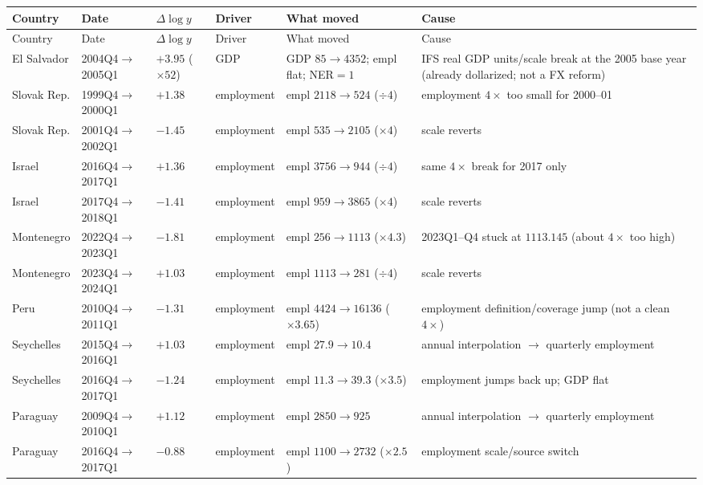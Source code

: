 \documentclass[11pt]{article}
\begin{document}
{\small
\setlength{\tabcolsep}{5pt}
\begin{longtable}{@{}llp{2.6cm}lp{3.6cm}p{6.8cm}@{}}
\toprule
Country & Date & $\Delta\log y$ & Driver & What moved & Cause \\
\midrule
\endfirsthead
\toprule
Country & Date & $\Delta\log y$ & Driver & What moved & Cause \\
\midrule
\endhead
\bottomrule
\endfoot
El Salvador & 2004Q4$\to$2005Q1 & $+3.95$ ($\times 52$) & GDP & GDP $85\to 4352$; empl flat; NER${}=1$ &
IFS real GDP units/scale break at the 2005 base year (already dollarized; not a FX reform) \\
\addlinespace
Slovak Rep. & 1999Q4$\to$2000Q1 & $+1.38$ & employment & empl $2118\to 524$ ($\div 4$) &
employment $4\times$ too small for 2000--01 \\
\addlinespace
Slovak Rep. & 2001Q4$\to$2002Q1 & $-1.45$ & employment & empl $535\to 2105$ ($\times 4$) &
scale reverts \\
\addlinespace
Israel & 2016Q4$\to$2017Q1 & $+1.36$ & employment & empl $3756\to 944$ ($\div 4$) &
same $4\times$ break for 2017 only \\
\addlinespace
Israel & 2017Q4$\to$2018Q1 & $-1.41$ & employment & empl $959\to 3865$ ($\times 4$) &
scale reverts \\
\addlinespace
Montenegro & 2022Q4$\to$2023Q1 & $-1.81$ & employment & empl $256\to 1113$ ($\times 4.3$) &
2023Q1--Q4 stuck at $1113.145$ (about $4\times$ too high) \\
\addlinespace
Montenegro & 2023Q4$\to$2024Q1 & $+1.03$ & employment & empl $1113\to 281$ ($\div 4$) &
scale reverts \\
\addlinespace
Peru & 2010Q4$\to$2011Q1 & $-1.31$ & employment & empl $4424\to 16136$ ($\times 3.65$) &
employment definition/coverage jump (not a clean $4\times$) \\
\addlinespace
Seychelles & 2015Q4$\to$2016Q1 & $+1.03$ & employment & empl $27.9\to 10.4$ &
annual interpolation $\to$ quarterly employment \\
\addlinespace
Seychelles & 2016Q4$\to$2017Q1 & $-1.24$ & employment & empl $11.3\to 39.3$ ($\times 3.5$) &
employment jumps back up; GDP flat \\
\addlinespace
Paraguay & 2009Q4$\to$2010Q1 & $+1.12$ & employment & empl $2850\to 925$ &
annual interpolation $\to$ quarterly employment \\
\addlinespace
Paraguay & 2016Q4$\to$2017Q1 & $-0.88$ & employment & empl $1100\to 2732$ ($\times 2.5$) &
employment scale/source switch \\

\end{longtable}}
\end{document}
